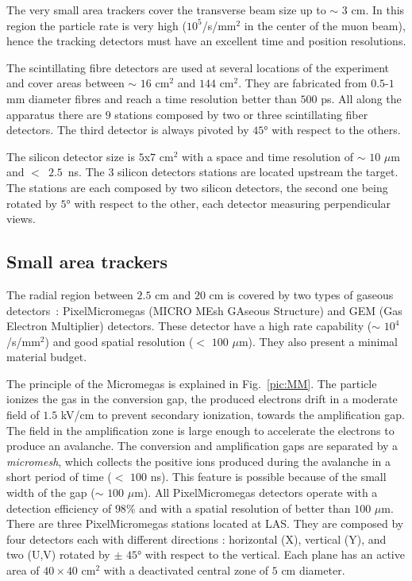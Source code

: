 The very small area trackers cover the transverse beam size up to $\sim$ $3$ cm. In this region the particle rate is very high ($10^5$/s/mm$^2$ in the center of the muon beam), hence the tracking detectors must have an excellent time and position resolutions.

The scintillating fibre detectors are used at several locations of the experiment and cover areas between $\sim$ $16$ cm$^2$ and $144$ cm$^2$. They are fabricated from $0.5$-$1$ mm diameter fibres and reach a time resolution better than $500$ ps. All along the apparatus there are $9$ stations composed by two or three scintillating fiber detectors. The third detector is always pivoted by $45$° with respect to the others.

The silicon detector size is $5$x$7$ cm$^2$ with a space and time resolution of $\sim$ $10$ $\mu$m and $<$~$2.5$~ns. The $3$ silicon detectors stations are located upstream the target. The stations are each composed by two silicon detectors, the second one being rotated by $5$° with respect to the other, each detector measuring perpendicular views.

\subsection{Small area trackers}

The radial region between $2.5$ cm and $20$ cm is covered by two types of gaseous detectors~: PixelMicromegas (MICRO MEsh GAseous Structure) and GEM (Gas Electron Multiplier) detectors. These detector have a high rate capability ($\sim$ $10^4$/s/mm$^2$) and good spatial resolution ($<$ $100$ $\mu$m). They also present a minimal material budget.

The principle of the Micromegas is explained in Fig.~\ref{pic:MM}. The particle ionizes the gas in the conversion gap, the produced electrons drift in a moderate field of $1.5$ kV/cm to prevent secondary ionization, towards the amplification gap. The field in the amplification zone is large enough to accelerate the electrons to produce an avalanche. The conversion and amplification gaps are separated by a \textit{micromesh}, which collects the positive ions produced during the avalanche in a short period of time ($<$ $100$ ns). This feature is possible because of the small width of the gap ($\sim$ $100$ $\mu$m). All PixelMicromegas detectors operate with a detection efficiency of $98$\% and with a spatial resolution of better than $100$ $\mu$m. There are three PixelMicromegas stations located at LAS. They are composed by four detectors each with different directions : horizontal (X), vertical (Y), and two (U,V) rotated by $\pm$ $45$° with respect to the vertical. Each plane has an active area of $40 \times 40$ cm$^2$ with a deactivated central zone of $5$ cm diameter.

